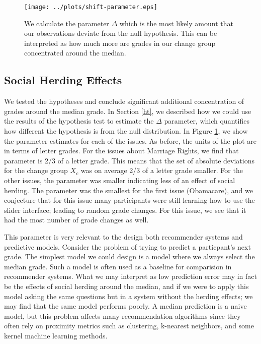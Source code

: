 \begin{figure}[ht!]
  \centering
    \texttt{[image: ../plots/shift-parameter.eps]}
      \caption{We calculate the parameter $\Delta$ which is the most likely amount that our observations deviate from the null hypothesis. This can be interpreted as how much more are grades in our change group concentrated around the median.}
      \label{shift-1}
\end{figure}

\subsection{Social Herding Effects}
We tested the hypotheses and conclude significant additional concentration of grades around the median grade.
In Section \ref{ht}, we described how we could use the results of the hypothesis test to estimate the $\Delta$ parameter, which quantifies how different the hypothesis is from the null distribution.
In Figure \ref{shift-1}, we show the parameter estimates for each of the issues.
As before, the units of the plot are in terms of letter grades.
For the issues about Marriage Rights, we find that parameter is 2/3 of a letter grade.
This means that the set of absolute deviations for the change group $X_c$ was on average 2/3 of a letter grade smaller.
For the other issues, the parameter was smaller indicating less of an effect of social herding.
The parameter was the smallest for the first issue (Obamacare), and we conjecture that for this issue many participants were still learning how to use the slider interface; leading to random grade changes.
For this issue, we see that it had the most number of grade changes as well.

This parameter is very relevant to the design both recommender systems and predictive models.
Consider the problem of trying to predict a particpant's next grade.
The simplest model we could design is a model where we always select the median grade.
Such a model is often used as a baseline for comparision in recommender systems.
What we may interpret as low prediction error may in fact be the effects of social herding around the median, and if we were to apply this model asking the same questions but in a system without the herding effects; we may find that the same model performs poorly.
A median prediction is a naive model, but this problem affects many recommendation algorithms since they often rely on proximity metrics such as clustering, k-nearest neighbors, and some kernel machine learning methods.


